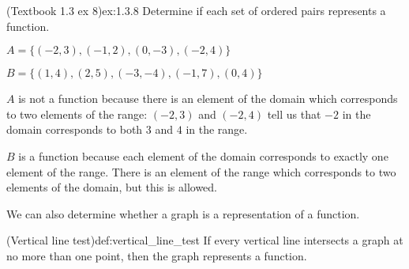 \documentclass{article}
\begin{document}
\begin{example}{(Textbook 1.3 ex 8)}{ex:1.3.8}
    Determine if each set of ordered pairs represents a function.
    \begin{problem}
        \item $A=\{(-2,3),(-1,2),(0,-3),(-2,4)\}$
        \item $B=\{(1,4),(2,5),(-3,-4),(-1,7),(0,4)\}$
    \end{problem}
\end{example}
\begin{solution}
    \begin{problem}
        \item $A$ is not a function because there is an element of the domain which corresponds to two elements of the range: $(-2,3)$ and $(-2,4)$ tell us that $-2$ in the domain corresponds to both $3$ and $4$ in the range.
        \item $B$ is a function because each element of the domain corresponds to exactly one element of the range. There is an element of the range which corresponds to two elements of the domain, but this is allowed.
    \end{problem}
\end{solution}

We can also determine whether a graph is a representation of a function.

\begin{definition}{(Vertical line test)}{def:vertical_line_test}
    If every vertical line intersects a graph at no more than one point, then the graph represents a function.
\end{definition}
\end{document}
